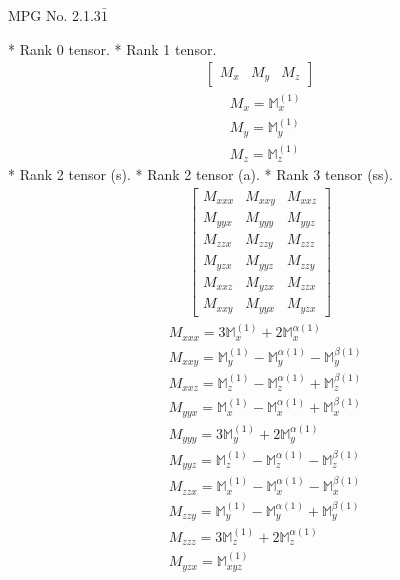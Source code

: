 \documentclass[fleqn,8pt,landscape]{jsarticle}
\begin{document}
\setcounter{MaxMatrixCols}{32}

\renewcommand{\tablename}{Table~}
\renewcommand{\figurename}{Figure~}
\begin{center}
\LARGE
MPG No. 2.1.3\quad$\bar{1}$
\end{center}
* Rank 0 tensor.
* Rank 1 tensor.
\begin{align*}
\begin{bmatrix} M_{x} & M_{y} & M_{z} \end{bmatrix}
\end{align*}
\begin{align*}
& M_{x} = \mathbb{M}_{x}^{(1)} \\
& M_{y} = \mathbb{M}_{y}^{(1)} \\
& M_{z} = \mathbb{M}_{z}^{(1)}
\end{align*}
* Rank 2 tensor (s).
* Rank 2 tensor (a).
* Rank 3 tensor (ss).
\begin{align*}
\begin{bmatrix} M_{xxx} & M_{xxy} & M_{xxz} \\ M_{yyx} & M_{yyy} & M_{yyz} \\ M_{zzx} & M_{zzy} & M_{zzz} \\ M_{yzx} & M_{yyz} & M_{zzy} \\ M_{xxz} & M_{yzx} & M_{zzx} \\ M_{xxy} & M_{yyx} & M_{yzx} \end{bmatrix}
\end{align*}
\begin{align*}
& M_{xxx} = 3 \mathbb{M}_{x}^{(1)} + 2 \mathbb{M}_{x}^{\alpha(1)} \\
& M_{xxy} = \mathbb{M}_{y}^{(1)} - \mathbb{M}_{y}^{\alpha(1)} - \mathbb{M}_{y}^{\beta(1)} \\
& M_{xxz} = \mathbb{M}_{z}^{(1)} - \mathbb{M}_{z}^{\alpha(1)} + \mathbb{M}_{z}^{\beta(1)} \\
& M_{yyx} = \mathbb{M}_{x}^{(1)} - \mathbb{M}_{x}^{\alpha(1)} + \mathbb{M}_{x}^{\beta(1)} \\
& M_{yyy} = 3 \mathbb{M}_{y}^{(1)} + 2 \mathbb{M}_{y}^{\alpha(1)} \\
& M_{yyz} = \mathbb{M}_{z}^{(1)} - \mathbb{M}_{z}^{\alpha(1)} - \mathbb{M}_{z}^{\beta(1)} \\
& M_{zzx} = \mathbb{M}_{x}^{(1)} - \mathbb{M}_{x}^{\alpha(1)} - \mathbb{M}_{x}^{\beta(1)} \\
& M_{zzy} = \mathbb{M}_{y}^{(1)} - \mathbb{M}_{y}^{\alpha(1)} + \mathbb{M}_{y}^{\beta(1)} \\
& M_{zzz} = 3 \mathbb{M}_{z}^{(1)} + 2 \mathbb{M}_{z}^{\alpha(1)} \\
& M_{yzx} = \mathbb{M}_{xyz}^{(1)}
\end{align*}
\end{document}
